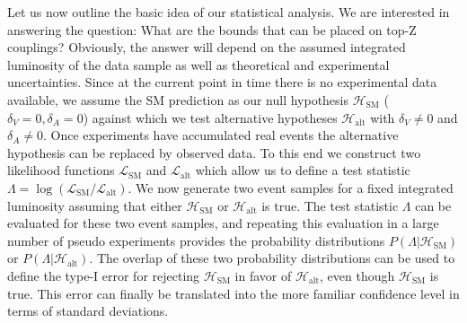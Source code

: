 \documentclass[preprint]{JHEP3} %
\newcommand{\SM}{\mathrm{SM}}
\newcommand{\alt}{\mathrm{alt}}
\def\Halt{\mathcal{H}_{\mathrm{alt}}}
\begin{document}
Let us now outline the basic idea of our statistical analysis.
We are interested in answering the question: What are the bounds that can be placed on top-Z couplings? 
Obviously, the answer will depend on the assumed integrated luminosity of the data sample as well as theoretical and experimental uncertainties.
Since at the current point in time there is no experimental data available, we assume the SM prediction as our null hypothesis $\mathcal{H}_{\mathrm{SM}}$ ($\delta_V=0, \delta_A=0$) 
against which we test alternative hypotheses $\Halt$ with $\delta_V\ne0$ and $\delta_A\ne0$.
Once experiments have accumulated real events the alternative hypothesis can be replaced by observed data.
To this end we construct two likelihood functions $\mathcal{L}_{\SM}$ and $\mathcal{L}_{\alt}$ which allow us to define a test statistic $\Lambda = \log \left( \mathcal{L}_{\SM} / \mathcal{L}_{\alt} \right)$.
We now generate two event samples for a fixed integrated luminosity assuming that either $\mathcal{H}_{\mathrm{SM}}$ or $\Halt$ is true.
The test statistic $\Lambda$ can be evaluated for these two event samples, and 
repeating this evaluation in a large number of pseudo experiments provides the probability distributions $P(\Lambda|\mathcal{H}_{\mathrm{SM}})$ or $P(\Lambda|\Halt)$.
The overlap of these two probability distributions can be used to define the type-I error for rejecting $\mathcal{H}_{\mathrm{SM}}$ in favor of $\Halt$, even though $\mathcal{H}_{\mathrm{SM}}$ is true.
This error can finally be translated into the more familiar confidence level in terms of standard deviations.
\end{document}
